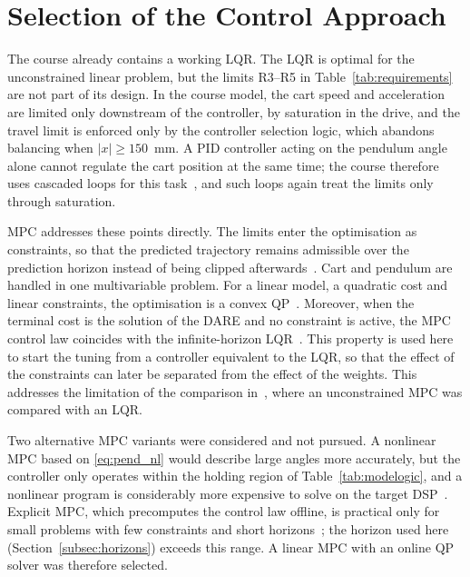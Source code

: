 \section{Selection of the Control Approach}
\label{sec:selection}

The course already contains a working \ac{LQR}. The \ac{LQR} is optimal for
the unconstrained linear problem, but the limits R3--R5 in
Table~\ref{tab:requirements} are not part of its design. In the course model,
the cart speed and acceleration are limited only downstream of the controller,
by saturation in the drive, and the travel limit is enforced only by the
controller selection logic, which abandons balancing when $|x| \ge 150$~mm.
A \ac{PID} controller acting on the pendulum angle alone cannot regulate the
cart position at the same time; the course therefore uses cascaded loops for
this task~\cite{ln_manual}, and such loops again treat the limits only through
saturation.

\ac{MPC} addresses these points directly. The limits enter the optimisation
as constraints, so that the predicted trajectory remains admissible over the
prediction horizon instead of being clipped afterwards~\cite{rawlings2000}.
Cart and pendulum are handled in one multivariable problem. For a linear
model, a quadratic cost and linear constraints, the optimisation is a convex \ac{QP}~\cite{rawlings2000}. Moreover, when the terminal
cost is the solution of the \acf{DARE} and no constraint is active, the \ac{MPC} control law coincides
with the infinite-horizon \ac{LQR}~\cite{rawlings2000}. This property is
used here to start the tuning from a controller equivalent to the
\ac{LQR}, so that the effect of the constraints can later be separated from
the effect of the weights. This addresses the limitation of the comparison
in~\cite{minouchehr2015}, where an unconstrained \ac{MPC} was compared with an
\ac{LQR}.

Two alternative \ac{MPC} variants were considered and not pursued.
A nonlinear \ac{MPC} based on \eqref{eq:pend_nl} would describe large angles
more accurately, but the controller only operates within the holding region of
Table~\ref{tab:modelogic}, and a nonlinear program is considerably more
expensive to solve on the target \ac{DSP}~\cite{rawlings2000}. Explicit
\ac{MPC}, which precomputes the control law offline, is practical only for
small problems with few constraints and short horizons~\cite{wang2010}; the
horizon used here (Section~\ref{subsec:horizons}) exceeds this range. A linear
\ac{MPC} with an online \ac{QP} solver was therefore selected.

